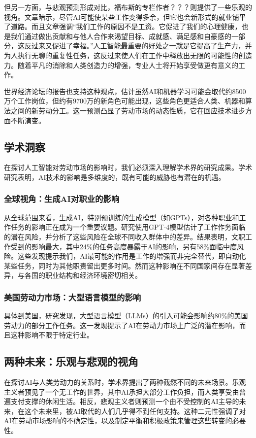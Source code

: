 \documentclass[11pt]{article}
\begin{document}
但另一方面，与悲观预测形成对比，福布斯的专栏作者？？？则提供了一些乐观的视角。文章暗示，尽管AI可能使某些工作变得多余，但它也会新形式的就业铺平了道路。而且文章强调“我们工作的原因不是工资。它促进了我们的心理健康，也是我们通过做出贡献和与他人合作来渴望目标、成就感、满足感和自豪感的一部分，这反过来又促进了幸福。”人工智能最重要的好处之一就是它提高了生产力，并为人执行无聊的重复性任务，这反过来使人们在工作中释放出无限的可能性的创造力。随着平凡的消除和人类创造力的增强，专业人士将开始享受做更有意义的工作。

世界经济论坛的报告也支持这种观点，估计虽然AI和机器学习可能会取代约8500万个工作岗位，但约有9700万的新角色可能出现，这些角色更适合人类、机器和算法之间的新劳动分工。这一预测凸显了劳动市场的动态性质，它在回应技术进步方面不断演变。

\subsection{学术洞察}
在探讨人工智能对劳动市场的影响时，我们必须深入理解学术界的研究成果。学术研究表明，AI技术的影响是多维度的，既有可能的威胁也有潜在的机遇。

\subsubsection{全球视角：生成AI对职业的影响}
从全球范围来看，生成AI，特别预训练的生成模型（如GPTs），对各种职业和工作任务的影响正在成为一个重要议题。研究使用GPT-4模型估计了工作作务面临的潜在风险，并分析了这些风险在全球不同收入群体中的差异。结果表明，文职工作受到的影响最大，其中24\%的任务高度暴露于AI的影响，另有58\%面临中度风险。这些发现提示我们，AI最可能的作用是工作的增强而非完全替代，即自动化某些任务，同时为其他职责留出更多时间。然而这种影响在不同国家间存在显著差异，与各国的职业结构和经济环境密切相关。

\subsubsection{美国劳动力市场：大型语言模型的影响}
具体到美国，研究发现，大型语言模型（LLMs）的引入可能会影响约80\%的美国劳动力的部分工作任务。这一发现提示了AI在劳动力市场上广泛的潜在影响，而且这种影响不限于特定行业。

\subsection{两种未来：乐观与悲观的视角}
在探讨AI与人类劳动力的关系时，学术界提出了两种截然不同的未来场景。乐观主义者预见了一个无工作的世界，其中AI承担大部分工作负担，而人类享受由普遍支付支撑的休闲生活。相反，悲观主义者则预测一个由不受控制的AI主导的未来，在这个未来里，被AI取代的人们几乎得不到任何支持。这种二元性强调了对AI在劳动市场影响的不确定性，以及制定平衡和积极政策来管理这些转变的必要性。
\end{document}
